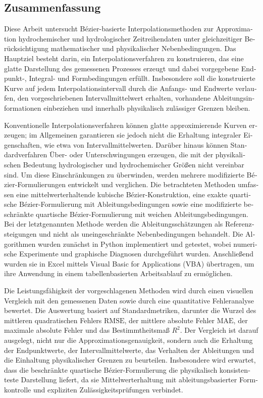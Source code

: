 \documentclass[12pt,a4paper]{article}
\begin{document}
\newpage
\begin{otherlanguage}{ngerman}
\section*{Zusammenfassung}

Diese Arbeit untersucht B\'ezier-basierte Interpolationsmethoden zur Approximation hydrochemischer und hydrologischer Zeitreihendaten unter gleichzeitiger Ber\"ucksichtigung mathematischer und physikalischer Nebenbedingungen. Das Hauptziel besteht darin, ein Interpolationsverfahren zu konstruieren, das eine glatte Darstellung des gemessenen Prozesses erzeugt und dabei vorgegebene Endpunkt-, Integral- und Formbedingungen erf\"ullt. Insbesondere soll die konstruierte Kurve auf jedem Interpolationsintervall durch die Anfangs- und Endwerte verlaufen, den vorgeschriebenen Intervallmittelwert erhalten, vorhandene Ableitungsinformationen einbeziehen und innerhalb physikalisch zul\"assiger Grenzen bleiben.

Konventionelle Interpolationsverfahren k\"onnen glatte approximierende Kurven erzeugen; im Allgemeinen garantieren sie jedoch nicht die Erhaltung integraler Eigenschaften, wie etwa von Intervallmittelwerten. Dar\"uber hinaus k\"onnen Standardverfahren \"Uber- oder Unterschwingungen erzeugen, die mit der physikalischen Bedeutung hydrologischer und hydrochemischer Gr\"o\ss en nicht vereinbar sind. Um diese Einschr\"ankungen zu \"uberwinden, werden mehrere modifizierte B\'ezier-Formulierungen entwickelt und verglichen. Die betrachteten Methoden umfassen eine mittelwerterhaltende kubische B\'ezier-Konstruktion, eine exakte quartische B\'ezier-Formulierung mit Ableitungsbedingungen sowie eine modifizierte beschr\"ankte quartische B\'ezier-Formulierung mit weichen Ableitungsbedingungen. Bei der letztgenannten Methode werden die Ableitungssch\"atzungen als Referenzsteigungen und nicht als uneingeschr\"ankte Nebenbedingungen behandelt. Die Algorithmen wurden zun\"achst in Python implementiert und getestet, wobei numerische Experimente und graphische Diagnosen durchgef\"uhrt wurden. Anschlie\ss end wurden sie in Excel mittels Visual Basic for Applications (VBA) \"ubertragen, um ihre Anwendung in einem tabellenbasierten Arbeitsablauf zu erm\"oglichen.

Die Leistungsf\"ahigkeit der vorgeschlagenen Methoden wird durch einen visuellen Vergleich mit den gemessenen Daten sowie durch eine quantitative Fehleranalyse bewertet. Die Auswertung basiert auf Standardmetriken, darunter die Wurzel des mittleren quadratischen Fehlers \(\mathrm{RMSE}\), der mittlere absolute Fehler \(\mathrm{MAE}\), der maximale absolute Fehler und das Bestimmtheitsma\ss{} \(R^2\). Der Vergleich ist darauf ausgelegt, nicht nur die Approximationsgenauigkeit, sondern auch die Erhaltung der Endpunktwerte, der Intervallmittelwerte, das Verhalten der Ableitungen und die Einhaltung physikalischer Grenzen zu beurteilen. Insbesondere wird erwartet, dass die beschr\"ankte quartische B\'ezier-Formulierung die physikalisch konsistenteste Darstellung liefert, da sie Mittelwerterhaltung mit ableitungsbasierter Formkontrolle und expliziten Zul\"assigkeitspr\"ufungen verbindet.


\end{otherlanguage}
\end{document}
